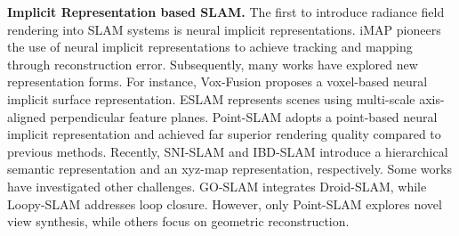 \noindent\textbf{Implicit Representation based SLAM.} 
The first to introduce radiance field rendering into SLAM systems is neural implicit representations. iMAP \cite{iMAP2021} pioneers the use of neural implicit representations to achieve tracking and mapping through reconstruction error. Subsequently, many works \cite{NICE-SLAM2022, Vox-Fusion2022, Orbeez-SLAM2023, ESLAM2023,Co-SLAM2023, SNI-SLAM2024, NGEL-SLAM2024,IBD-SLAM_2024_CVPR,NICER-SLAM2024} have explored new representation forms. For instance, Vox-Fusion \cite{Vox-Fusion2022} proposes a voxel-based neural implicit surface representation. ESLAM \cite{ESLAM2023} represents scenes using multi-scale axis-aligned perpendicular feature planes.  Point-SLAM \cite{Point-SLAM2023} adopts a point-based neural implicit representation and achieved far superior rendering quality compared to previous methods. Recently, SNI-SLAM \cite{SNI-SLAM2024} and IBD-SLAM \cite{IBD-SLAM_2024_CVPR} introduce a hierarchical semantic representation and an xyz-map representation, respectively. Some works \cite{GO-SLAM2023, Loopy-SLAM2024, PLGSLAM_2024_CVPR, CP-SLAM2023, UncLe-SLAM2023, HI-SLAM2024_NeRF, NIS-SLAM2024}  have investigated other challenges. GO-SLAM \cite{GO-SLAM2023} integrates Droid-SLAM, while Loopy-SLAM \cite{Loopy-SLAM2024} addresses loop closure. However, only Point-SLAM explores novel view synthesis, while others focus on geometric reconstruction.


